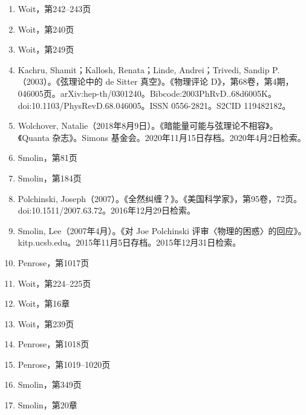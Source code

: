 \begin{enumerate}
\item Woit，第242–243页  
\item Woit，第240页  
\item Woit，第249页  
\item Kachru, Shamit；Kallosh, Renata；Linde, Andrei；Trivedi, Sandip P.（2003）。《弦理论中的 de Sitter 真空》。《物理评论 D》，第68卷，第4期，046005页。arXiv:hep-th/0301240。Bibcode:2003PhRvD..68d6005K。doi:10.1103/PhysRevD.68.046005。ISSN 0556-2821。S2CID 119482182。  
\item Wolchover, Natalie（2018年8月9日）。《暗能量可能与弦理论不相容》。《Quanta 杂志》。Simons 基金会。2020年11月15日存档。2020年4月2日检索。  
\item Smolin，第81页  
\item Smolin，第184页  
\item Polchinski, Joseph（2007）。《全然纠缠？》。《美国科学家》，第95卷，72页。doi:10.1511/2007.63.72。2016年12月29日检索。
\item Smolin, Lee（2007年4月）。《对 Joe Polchinski 评审〈物理的困惑〉的回应》。kitp.ucsb.edu。2015年11月5日存档。2015年12月31日检索。  
\item Penrose，第1017页  
\item Woit，第224–225页  
\item Woit，第16章  
\item Woit，第239页  
\item Penrose，第1018页  
\item Penrose，第1019–1020页  
\item Smolin，第349页  
\item Smolin，第20章
\end{enumerate}
